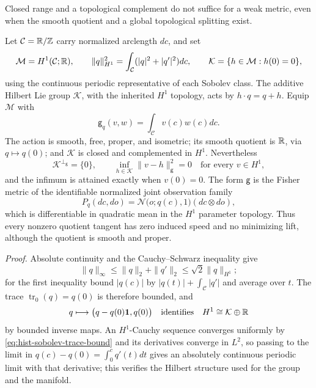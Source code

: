 Closed range and a topological complement do not suffice for a weak metric,
even when the smooth quotient and a global topological splitting exist.

Let \(\mathcal C=\mathbb R/\mathbb Z\) carry normalized arclength \(dc\), and set
\begin{equation}
\mathcal M=H^1(\mathcal C;\mathbb R),
\qquad
\|q\|_{H^1}^2=\int_{\mathcal C}(|q|^2+|q'|^2)dc,
\qquad
\mathcal K=\{h\in\mathcal M:h(0)=0\},
\label{eq:hist-weak-sobolev-model}
\end{equation}
using the continuous periodic representative of each Sobolev class. The
additive Hilbert Lie group \(\mathcal K\), with the inherited \(H^1\) topology,
acts by \(h\cdot q=q+h\). Equip \(\mathcal M\) with
\begin{equation}
\mathsf g_q(v,w)=\int_{\mathcal C}v(c)w(c)dc.
\label{eq:hist-weak-integrated-fisher}
\end{equation}
The action is smooth, free, proper, and isometric; its smooth quotient is
\(\mathbb R\), via \(q\mapsto q(0)\); and \(\mathcal K\) is closed and complemented in
\(H^1\). Nevertheless
\begin{equation}
\mathcal K^{\perp_{\mathsf g}}=\{0\},
\qquad
\inf_{h\in\mathcal K}\|v-h\|_{\mathsf g}^2=0
\quad\text{for every }v\in H^1,
\label{eq:hist-weak-quotient-collapse}
\end{equation}
and the infimum is attained exactly when \(v(0)=0\). The form \(\mathsf g\) is
the Fisher metric of the identifiable normalized joint observation family
\begin{equation}
P_q(dc,do)=\mathcal N\bigl(o;q(c),1\bigr)(dc\otimes do),
\label{eq:hist-weak-joint-law}
\end{equation}
which is differentiable in quadratic mean in the \(H^1\) parameter topology.
Thus every nonzero quotient tangent has zero induced speed and no minimizing
lift, although the quotient is smooth and proper. 

\noindent\emph{Proof.}
Absolute continuity and the Cauchy--Schwarz inequality give
\begin{equation}
\|q\|_\infty\leq\|q\|_2+\|q'\|_2\leq\sqrt2\|q\|_{H^1};
\label{eq:hist-sobolev-trace-bound}
\end{equation}
for the first inequality bound \(|q(c)|\) by \(|q(t)|+\int_{\mathcal C}|q'|\)
and average over \(t\). The trace \(\operatorname{tr}_0(q)=q(0)\) is therefore
bounded, and
\begin{equation}
q\longmapsto\bigl(q-q(0)\mathbf1,q(0)\bigr)
\quad\text{identifies}\quad
H^1\cong\mathcal K\oplus\mathbb R
\label{eq:hist-trace-topological-splitting}
\end{equation}
by bounded inverse maps. An \(H^1\)-Cauchy sequence converges uniformly by
\eqref{eq:hist-sobolev-trace-bound} and its derivatives converge in \(L^2\), so
passing to the limit in \(q(c)-q(0)=\int_0^cq'(t)dt\) gives an absolutely
continuous periodic limit with that derivative; this verifies the Hilbert
structure used for the group and the manifold.

